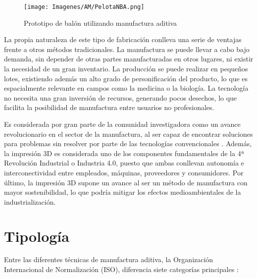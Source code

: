 \documentclass{report}
\begin{document}
\vspace{0.4cm}
\begin{figure}[hbpt]
    \centering
    \texttt{[image: Imagenes/AM/PelotaNBA.png]}
    \caption{Prototipo de balón utilizando manufactura aditiva \cite{AMInnovativeNBA}}
    \label{fig:PelotaNBA}
\end{figure}
\vspace{0.4cm}


La propia naturaleza de este tipo de fabricación conlleva una serie de ventajas frente a otros métodos tradicionales. La manufactura se puede llevar a cabo bajo demanda, sin depender de otras partes manufacturadas en otros lugares, ni existir la necesidad de un gran inventario. La producción se puede realizar en pequeños lotes, existiendo además un alto grado de personificación del producto, lo que es espacialmente relevante en campos como la medicina o la biología. La tecnología no necesita una gran inversión de recursos, generando pocos desechos, lo que facilita la posibilidad de manufactura entre usuarios no profesionales. \cite{AMGoodArticle}

Es considerada por gran parte de la comunidad investigadora como un avance revolucionario en el sector de la manufactura, al ser capaz de encontrar soluciones para problemas sin resolver por parte de las tecnologías convencionales \cite{AMRevolution}. Además, la impresión 3D es considerada uno de los componentes fundamentales de la 4ª Revolución Industrial o Industria 4.0, puesto que ambas conllevan autonomía e interconectividad entre empleados, máquinas, proveedores y consumidores. Por último, la impresión 3D supone un avance al ser un método de manufactura con mayor sostenibilidad, lo que podría mitigar los efectos medioambientales de la industrialización. \cite{AMNoWikiDefinition40Industry}


\section{Tipología}

Entre las diferentes técnicas de manufactura aditiva, la Organización Internacional de Normalización (ISO), diferencia siete categorías principales \cite{AMTipos}:
\end{document}
